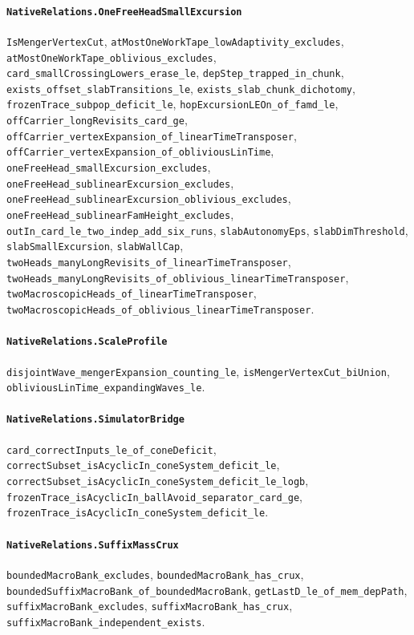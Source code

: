 \paragraph{\texttt{NativeRelations.OneFreeHeadSmallExcursion}}
{\small\raggedright \texttt{IsMengerVertexCut}, \texttt{atMostOneWorkTape\_lowAdaptivity\_excludes}, \texttt{atMostOneWorkTape\_oblivious\_excludes}, \texttt{card\_smallCrossingLowers\_erase\_le}, \texttt{depStep\_trapped\_in\_chunk}, \texttt{exists\_offset\_slabTransitions\_le}, \texttt{exists\_slab\_chunk\_dichotomy}, \texttt{frozenTrace\_subpop\_deficit\_le}, \texttt{hopExcursionLEOn\_of\_famd\_le}, \texttt{offCarrier\_longRevisits\_card\_ge}, \texttt{offCarrier\_vertexExpansion\_of\_linearTimeTransposer}, \texttt{offCarrier\_vertexExpansion\_of\_obliviousLinTime}, \texttt{oneFreeHead\_smallExcursion\_excludes}, \texttt{oneFreeHead\_sublinearExcursion\_excludes}, \texttt{oneFreeHead\_sublinearExcursion\_oblivious\_excludes}, \texttt{oneFreeHead\_sublinearFamHeight\_excludes}, \texttt{outIn\_card\_le\_two\_indep\_add\_six\_runs}, \texttt{slabAutonomyEps}, \texttt{slabDimThreshold}, \texttt{slabSmallExcursion}, \texttt{slabWallCap}, \texttt{twoHeads\_manyLongRevisits\_of\_linearTimeTransposer}, \texttt{twoHeads\_manyLongRevisits\_of\_oblivious\_linearTimeTransposer}, \texttt{twoMacroscopicHeads\_of\_linearTimeTransposer}, \texttt{twoMacroscopicHeads\_of\_oblivious\_linearTimeTransposer}.\par}

\paragraph{\texttt{NativeRelations.ScaleProfile}}
{\small\raggedright \texttt{disjointWave\_mengerExpansion\_counting\_le}, \texttt{isMengerVertexCut\_biUnion}, \texttt{obliviousLinTime\_expandingWaves\_le}.\par}

\paragraph{\texttt{NativeRelations.SimulatorBridge}}
{\small\raggedright \texttt{card\_correctInputs\_le\_of\_coneDeficit}, \texttt{correctSubset\_isAcyclicIn\_coneSystem\_deficit\_le}, \texttt{correctSubset\_isAcyclicIn\_coneSystem\_deficit\_le\_logb}, \texttt{frozenTrace\_isAcyclicIn\_ballAvoid\_separator\_card\_ge}, \texttt{frozenTrace\_isAcyclicIn\_coneSystem\_deficit\_le}.\par}

\paragraph{\texttt{NativeRelations.SuffixMassCrux}}
{\small\raggedright \texttt{boundedMacroBank\_excludes}, \texttt{boundedMacroBank\_has\_crux}, \texttt{boundedSuffixMacroBank\_of\_boundedMacroBank}, \texttt{getLastD\_le\_of\_mem\_depPath}, \texttt{suffixMacroBank\_excludes}, \texttt{suffixMacroBank\_has\_crux}, \texttt{suffixMacroBank\_independent\_exists}.\par}

